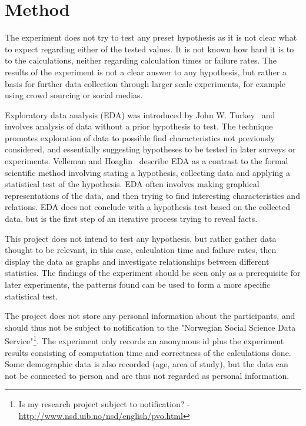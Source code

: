 \section{Method}
The experiment does not try to test any preset hypothesis as it is not clear what to expect regarding either of the tested values. It is not known how hard it is to to the calculations, neither regarding calculation times or failure rates. The results of the experiment is not a clear answer to any hypothesis, but rather a basis for further data collection through larger scale experiments, for example using crowd sourcing or social medias.

\par Exploratory data analysis (EDA) was introduced by John W. Turkey~\cite{turkey} and involves analysis of data without a prior hypothesis to test. The technique promotes exploration of data to possible find characteristics not previously considered, and essentially suggesting hypotheses to be tested in later surveys or experiments. Velleman and Hoaglin~\cite{exploratory-analysis} describe EDA as a contrast to the formal scientific method involving stating a hypothesis, collecting data and applying a statistical test of the hypothesis. EDA often involves making graphical representations of the data, and then trying to find interesting characteristics and relations. EDA does not conclude with a hypothesis test based on the collected data, but is the first step of an iterative process trying to reveal facts. 
\par This project does not intend to test any hypothesis, but rather gather data thought to be relevant, in this case, calculation time and failure rates, then display the data as graphs and investigate relationships between different statistics. The findings of the experiment should be seen only as a prerequisite for later experiments, the patterns found can be used to form a more specific statistical test.
\begin{remark}
 The project does not store any personal information about the participants, and should thus not be subject to notification to the "Norwegian Social Science Data Service"\footnote{Is my research project subject to notification? - \url{http://www.nsd.uib.no/nsd/english/pvo.html}}. The experiment only records an anonymous id plus the experiment results consisting of computation time and correctness of the calculations done. Some demographic data is also recorded (age, area of study), but the data can not be connected to person and are thus not regarded as personal information.
 \end{remark}

